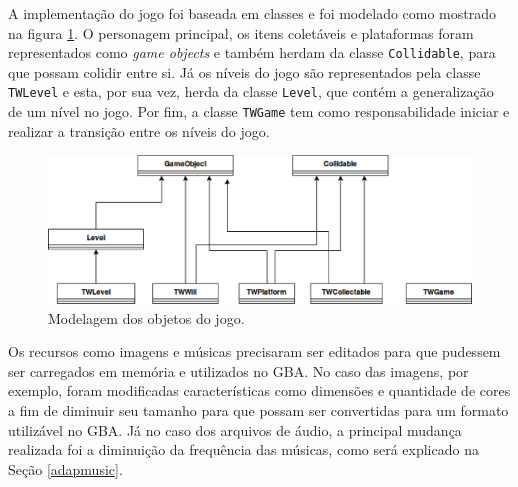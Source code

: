     A implementação do jogo foi baseada em classes e foi modelado como mostrado na figura \ref{model-final}. O personagem principal, os itens coletáveis e plataformas foram representados como \textit{game objects} e também herdam da classe \texttt{Collidable}, para que possam colidir entre si. Já os níveis do jogo são representados pela classe \texttt{TWLevel} e esta, por sua vez, herda da classe \texttt{Level}, que contém a generalização de um nível no jogo. Por fim, a classe \texttt{TWGame} tem como responsabilidade iniciar e realizar a transição entre os níveis do jogo.

    \begin{figure}[H]
      \centering \includegraphics[keepaspectratio=true,scale=0.6]{figuras/modelagem-final.eps}
      \caption[Modelagem dos objetos do jogo]
        {Modelagem dos objetos do jogo.}
      \label{model-final}
    \end{figure}

    Os recursos como imagens e músicas precisaram ser editados para que pudessem ser carregados em memória e utilizados no GBA. No caso das imagens, por exemplo, foram modificadas características como dimensões e quantidade de cores a fim de diminuir seu tamanho para que possam ser convertidas para um formato utilizável no GBA. Já no caso dos arquivos de áudio, a principal mudança realizada foi a diminuição da frequência das músicas, como será explicado na Seção \ref{adapmusic}.